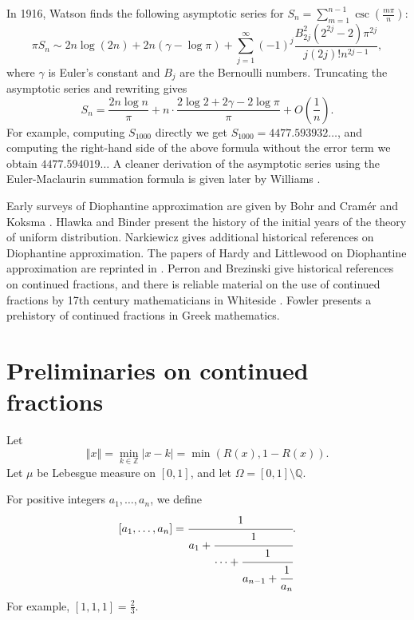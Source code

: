 \documentclass{amsart}
\newcommand{\norm}[1]{\left\Vert #1 \right\Vert}
\begin{document}
In 1916, Watson \cite{watson}
finds the following asymptotic series for
$S_n=\sum_{m=1}^{n-1} \csc\left( \frac{m\pi}{n} \right)$:
\[
\pi S_n \sim 2n\log(2n)+2n(\gamma-\log \pi)+\sum_{j=1}^\infty (-1)^j \frac{B_{2j}^2 ( 2^{2j}-2)\pi^{2j}}{j(2j)! n^{2j-1}},
\]
where $\gamma$ is Euler's constant and $B_j$ are the Bernoulli numbers.
Truncating the asymptotic series and rewriting
gives
\[
S_n=\frac{2n\log n}{\pi}+n \cdot \frac{2\log 2+2\gamma-2\log \pi}{\pi}+O\left(\frac{1}{n}\right).
\]
For example, computing $S_{1000}$ directly we get $S_{1000}=4477.593932\ldots$, and computing the right-hand side of the above formula  without the error term we obtain
$4477.594019\ldots$
A cleaner derivation of the asymptotic series using the Euler-Maclaurin summation formula is given
later by Williams \cite{williams}.


Early surveys of Diophantine approximation are given by Bohr and Cram\'er \cite[pp.~833--836, \S 39]{bohr} and Koksma \cite[pp.~102--110]{koksma}.
Hlawka and Binder \cite{hlawka} present the history of the initial years of the theory of uniform distribution.
Narkiewicz \cite[pp.~82--95, \S 2.5 and pp.~175--183 \S 3.5]{narkiewicz} gives additional historical references on Diophantine approximation.
The papers of Hardy and Littlewood on Diophantine approximation are reprinted in \cite{collectedpapers}. Perron \cite{perron}
and Brezinski \cite{brezinski} give historical references on continued fractions,
and there is  reliable material on the use of continued fractions by 17th century mathematicians in Whiteside \cite{whiteside}.
Fowler \cite{fowler}
presents a  prehistory of continued fractions in Greek mathematics.



\section{Preliminaries on continued fractions}
\label{preliminaries}
Let 
\[
\norm{x}=\min_{k \in \mathbb{Z}} |x-k|=\min(R(x),1-R(x)).
\]
Let $\mu$ be Lebesgue measure on $[0,1]$, and let $\Omega=[0,1] \setminus \mathbb{Q}$.

For positive integers $a_1,\ldots,a_n$, we define
\[
[a_1,\ldots,a_n]=\cfrac{1}{a_1+\cfrac{1}{\cdots+\cfrac{1}{a_{n-1}+\cfrac{1}{a_n}}}}.
\]
For example, $[1,1,1]=\frac{2}{3}$.
\end{document}
